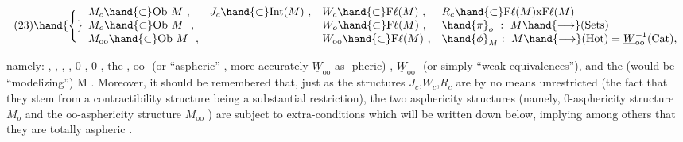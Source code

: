 
\[
(23)\hand{\Biggl\{}\begin{array}{llll}
M_c\hand{\subset}\mathrm{Ob}\ M\ , & J_c\hand{\subset}\mathrm{Int}(M)\ , & W_c\hand{\subset}\mathrm{F}\ell(M)\ , & R_c\hand{\subset}\mathrm{F}\ell(M)\mathrm{x}\mathrm{F}\ell(M)\\
M_o\hand{\subset}\mathrm{Ob}\ M\ \ , & & W_o\hand{\subset}\mathrm{F}\ell(M)\ , & \hand{\pi}_o\ :\ M\hand{\longrightarrow}(\mathrm{Sets})\\
M_\mathrm{oo}\hand{\subset}\mathrm{Ob}\ M\ \ , & & W_\mathrm{oo}\hand{\subset}\mathrm{F}\ell(M)\ , & \hand{\phi}_M:\ M\hand{\longrightarrow}(\mathrm{Hot})=\underline{W}_\mathrm{oo}^{-1}(\mathrm{Cat}),
\end{array}
\]

namely: \hand{\uline{\textcolor{black}{contractible objects}}}, \hand{\uline{\textcolor{black}{homotopy intervals}}}, \hand{\uline{\textcolor{black}{homotopisms}}}, \hand{\uline{\textcolor{black}{homotopy}}}
\hand{\uline{\textcolor{black}{relation for maps}}}, 0-\hand{\uline{\textcolor{black}{connected objects}}}, 0-\hand{\uline{\textcolor{black}{connected maps}}},\hand{(*)} the \hand{\uline{\textcolor{black}{connected}}}
\hand{\uline{\textcolor{black}{components functor}}}, $\mathrm{oo}$-\hand{\uline{\textcolor{black}{connected}}} (or ``aspheric'' , more accurately $\underline{W}_\mathrm{oo}$-as-%
pheric) \hand{\uline{\textcolor{black}{objects}}},  $\underline{W}_\mathrm{oo}$-\hand{\uline{\textcolor{black}{equivalences}}} (or simply ``weak
equivalences''), and the (would-be ``modelizing'') \hand{\uline{\textcolor{black}{canonical functor}}} \hand{\uline{\textcolor{black}{from}}} M
\hand{\uline{\textcolor{black}{to homotopy types}}}. Moreover, it should be remembered that, just as
the structures $J_c$,$W_c$,$R_c$ are by no means unrestricted (the fact that they
stem from a contractibility structure being a substantial restriction),
the two asphericity structures (namely,  0-asphericity structure $M_o$ and
the $\mathrm{oo}$-asphericity structure $M_\mathrm{oo}$ ) are  subject to extra-conditions which
will be written down below, implying  among others that they are
totally aspheric .

